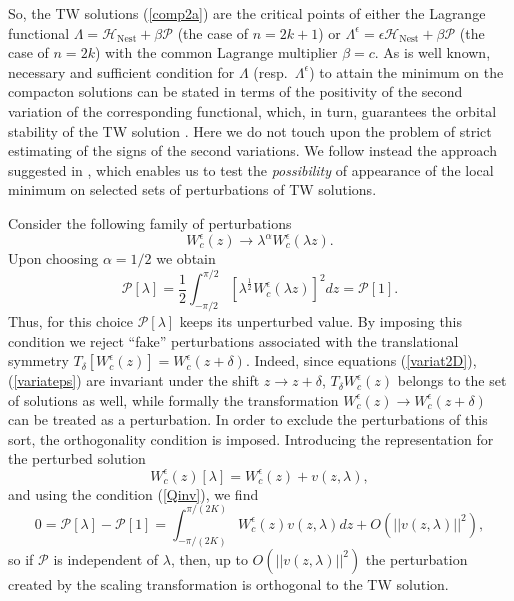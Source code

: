 \documentclass[12pt]{article}
\begin{document}
So, the TW solutions  (\ref{comp2a}) are  the critical points of either the Lagrange functional $\Lambda=\mathcal{H}_{\mathrm{Nest}} +\beta \mathcal{P}$ (the case of $n=2 k+1$) or
$\Lambda^\epsilon=\epsilon \mathcal{H}_{\mathrm{Nest}} +\beta\mathcal{P}$ (the case of $n=2 k$) with the common Lagrange multiplier $\beta=c$.
As is well known, necessary and sufficient
condition for $\Lambda$ (resp.\ $\Lambda^\epsilon$) to attain the minimum on the compacton solutions can be stated in terms of the positivity of the
second variation of the corresponding functional, which, in turn, guarantees the orbital stability of the TW solution \cite{KaPromis}. Here we do not touch upon the problem of strict estimating of the signs of the second variations. We follow instead the approach suggested in \cite{Derrick_64,Zakharov_86,Karpman_95}, which enables us to test the {\em possibility} of appearance of the local minimum  on selected sets of perturbations of TW solutions.


Consider the following family of perturbations
\begin{equation}\label{scaling1A}
W_c^\epsilon(z) \rightarrow \lambda^\alpha W_c^\epsilon(\lambda z).
\end{equation}
Upon choosing $\alpha=1/2$ we obtain
\begin{equation}\label{Qinv}
\mathcal{P}[\lambda]=\frac{1}{2}\int_{-\pi/2}^{\pi/2}{\left[\lambda^\frac{1}{2} W_c^\epsilon(\lambda z)\right]^2 d z}=\mathcal{P}[1].
\end{equation}
Thus, for this choice $\mathcal{P}[\lambda]$ keeps its unperturbed value.
By imposing this condition we reject ``fake'' perturbations associated with the translational symmetry $T_\delta\left[W_c^\epsilon(z)\right]=W_c^\epsilon(z+\delta)$. Indeed, since equations (\ref{variat2D}), (\ref{variateps}) are invariant under the shift $z \to  z+\delta$,  $T_\delta W_c^\epsilon(z)$ belongs to the set of solutions as well, while formally the transformation $W_c^\epsilon(z) \rightarrow W_c^\epsilon(z+\delta)$ can be treated as a perturbation. In order to exclude the perturbations of this sort, the orthogonality condition  is imposed. Introducing the representation for the perturbed solution
\[
W_c^\epsilon(z)[\lambda]=W_c^\epsilon(z)+v(z, \lambda),
\]
and using the condition (\ref{Qinv}), we find
\[
0=\mathcal{P}[\lambda]-\mathcal{P}[1]=\int_{-\pi/(2 K)}^{\pi/(2 K)} W_c^\epsilon(z) v(z, \lambda) d z+O\left(||v(z, \lambda)||^2\right),
\]
so if $\mathcal{P}$ is independent of $\lambda$, then, up to $O\left(||v(z, \lambda)||^2\right)$ the perturbation created by the scaling transformation is orthogonal to the TW solution.
\end{document}
